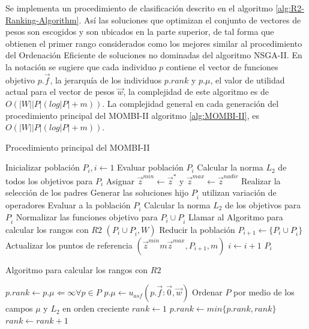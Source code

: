 Se implementa un procedimiento de clasificación descrito en el algoritmo \ref{alg:R2-Ranking-Algorithm}.
%
Así las soluciones que optimizan el conjunto de vectores de pesos son escogidos y son ubicados en la parte superior, de tal forma que obtienen el primer rango considerados como los mejores similar al procedimiento del Ordenación Eficiente de soluciones no dominadas del algoritmo NSGA-II.
%
En la notación se sugiere que cada individuo $p$ contiene el vector de funciones objetivo $p.\vec{f}$, la jerarquía de los individuos $p.rank$ y $p.\mu$, el valor de utilidad actual para el vector de pesos $\vec{w}$, la complejidad de este algoritmo es de $O(|W||P|(log |P| + m) )$.
%
La complejidad general en cada generación del procedimiento principal del MOMBI-II algoritmo \ref{alg:MOMBI-II}, es $O(|W||P|(log |P| + m) )$.
%
\begin{algorithm}[H]
\caption{Procedimiento principal del MOMBI-II}
\label{alg:MOMBI-II}
\begin{scriptsize}
\begin{algorithmic}[1]
	\STATE Inicializar población $P_i,i \leftarrow 1$
    \STATE Evaluar población $P_i$
    \STATE Calcular la norma $L_2$ de todos los objetivos para $P_i$
    \STATE Asignar $ \vec{z}^{min} \leftarrow \vec{z}^*$ y $\vec{z}^{max} \leftarrow \vec{z}^{nadir}$
    	\STATE Realizar la selección de los padres
        \STATE Generar las soluciones hijo $P^,_i$ utilizan variación de operadores
        \STATE Evaluar a la población $P^,_i$
        \STATE Calcular la norma $L_2$ de los objetivos para $P^,_i$
        \STATE Normalizar las funciones objetivo para $P_i \cup P^,_i$
        \STATE Llamar al Algoritmo para calcular los rangos con $R2$ $(P_i \cup P^,_i, W)$
        \STATE Reducir la población $P_{i+1} \leftarrow \{P_i \cup P^,_i\}$
        \STATE Actualizar los puntos de referencia $(\vec{z}^{min}m \vec{z}^{max}, P_{i+1}, m)$
        \STATE $i \leftarrow i+1$
    \ENDWHILE
    \RETURN $P_i$
\end{algorithmic}
\end{scriptsize}
\end{algorithm}

%
\begin{algorithm}[H]
\caption{Algoritmo para calcular los rangos con $R2$}
\label{alg:R2-Ranking-Algorithm}
\begin{scriptsize}
\begin{algorithmic}[1]
	\STATE $p.rank \leftarrow p.\mu \Leftarrow \infty \forall p \in P $
        	\STATE $p.\mu \leftarrow u_{asf}(p.\vec{f}:\vec{0}, \vec{w})$
        \ENDFOR
        \STATE Ordenar $P$ por medio de los campos $\mu$ y $L_2$ en orden creciente 
    	\STATE $rank \leftarrow 1$
        	\STATE $p.rank \leftarrow min\{ p.rank, rank \}$
			\STATE $rank \leftarrow rank+1$
		\ENDFOR
    \ENDFOR
\end{algorithmic}
\end{scriptsize}
\end{algorithm}

